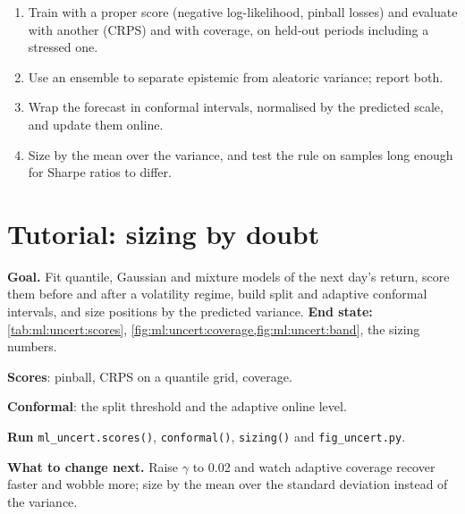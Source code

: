 \begin{method}\label{met:ml:uncert:method}
\begin{enumerate}
\item Train with a proper score (negative log-likelihood, pinball losses) and evaluate with another (CRPS) and with
coverage, on held-out periods including a stressed one.
\item Use an ensemble to separate epistemic from aleatoric variance; report both.
\item Wrap the forecast in conformal intervals, normalised by the predicted scale, and update them online.
\item Size by the mean over the variance, and test the rule on samples long enough for Sharpe ratios to differ.
\end{enumerate}
\end{method}

\section{Tutorial: sizing by doubt}\label{tut:ml:probabilistic-models-and-uncertainty:tut}

\begin{tutorial}
\textbf{Goal.} Fit quantile, Gaussian and mixture models of the next day's return, score them before and after a
volatility regime, build split and adaptive conformal intervals, and size positions by the predicted variance.
\textbf{End state:} \cref{tab:ml:uncert:scores}, \cref{fig:ml:uncert:coverage,fig:ml:uncert:band}, the sizing numbers.
\begin{tutsteps}
\item \textbf{Scores}: pinball, CRPS on a quantile grid, coverage.
\label{lst:ml:uncert:scores}
\item \textbf{Conformal}: the split threshold and the adaptive online level.
\label{lst:ml:uncert:conformal}
\item \textbf{Run} \texttt{ml\_uncert.scores()}, \texttt{conformal()}, \texttt{sizing()} and \texttt{fig\_uncert.py}.
\end{tutsteps}
\textbf{What to change next.} Raise $\gamma$ to 0.02 and watch adaptive coverage recover faster and wobble more; size by
the mean over the standard deviation instead of the variance.
\end{tutorial}


